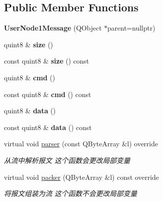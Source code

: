\subsection*{Public Member Functions}
\begin{DoxyCompactItemize}
\item 
\mbox{\label{class_user_node1_message_a0b1b1ef452a475ea359cbf08cedd3299}} 
{\bfseries User\+Node1\+Message} (Q\+Object $\ast$parent=nullptr)
\item 
\mbox{\label{class_user_node1_message_a5e1edefe83f860cea682d407b2292799}} 
quint8 \& {\bfseries size} ()
\item 
\mbox{\label{class_user_node1_message_ab70ede952786481568067af6d728c75d}} 
const quint8 \& {\bfseries size} () const
\item 
\mbox{\label{class_user_node1_message_a500a6e6be3507097e88bd88f5d1cd9b9}} 
quint8 \& {\bfseries cmd} ()
\item 
\mbox{\label{class_user_node1_message_affd542262ed6573c3cdfdc062afc4e53}} 
const quint8 \& {\bfseries cmd} () const
\item 
\mbox{\label{class_user_node1_message_ad08954c2d6caf8da498eba0390bff049}} 
quint8 \& {\bfseries data} ()
\item 
\mbox{\label{class_user_node1_message_a2d2bf051050cd32d6ebba7166c96938e}} 
const quint8 \& {\bfseries data} () const
\item 
virtual void \mbox{\hyperlink{class_user_node1_message_acfe0ac6d034bb3b7bc4553e44c5e41c1}{parser}} (const Q\+Byte\+Array \&l) override
\begin{DoxyCompactList}\small\item\em 从流中解析报文 这个函数会更改局部变量 \end{DoxyCompactList}\item 
virtual void \mbox{\hyperlink{class_user_node1_message_a12d342fefa82c5eb14dd76d34bb4319b}{packer}} (Q\+Byte\+Array \&l) const override
\begin{DoxyCompactList}\small\item\em 将报文组装为流 这个函数不会更改局部变量 \end{DoxyCompactList}\end{DoxyCompactItemize}



